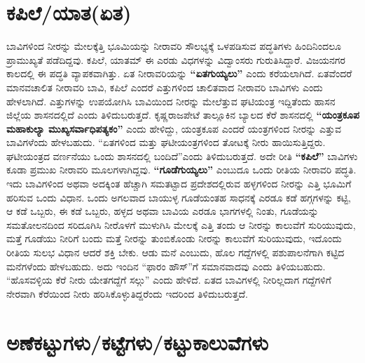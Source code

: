 \section*{ಕಪಿಲೆ/ಯಾತ(ಏತ)}

ಬಾವಿಗಳಿಂದ ನೀರನ್ನು ಮೇಲಕ್ಕೆತ್ತಿ ಭೂಮಿಯನ್ನು ನೀರಾವರಿ ಸೌಲಭ್ಯಕ್ಕೆ ಒಳಪಡಿಸುವ ಪದ್ಧತಿಗಳು ಹಿಂದಿನಿಂದಲೂ ಪ್ರಾಮುಖ್ಯತೆ ಪಡೆದಿದ್ದವು. ಕಪಿಲೆ, ಯಾತಮ್ ಈ ಎರಡು ವಿಧಗಳನ್ನು ವಿದ್ವಾಂಸರು ಗುರುತಿಸಿದ್ದಾರೆ. ವಿಜಯನಗರ ಕಾಲದಲ್ಲಿ ಈ ಪದ್ಧತಿ ವ್ಯಾಪಕವಾಗಿತ್ತು. ಏತ ನೀರಾವರಿಯನ್ನು \textbf{“ಏತಗುಯ್ಯಲು”} ಎಂದು ಕರೆಯಲಾಗಿದೆ. ಏತವೆಂದರೆ ಮಾನವಚಾಲಿತ ನೀರಾವರಿ ಬಾವಿ, ಕಪಿಲೆ ಎಂದರೆ ಎತ್ತುಗಳಿಂದ ಚಾಲಿತವಾದ ನೀರಾವರಿ ಬಾವಿಗಳು ಎಂದು ಹೇಳಲಾಗಿದೆ. ಎತ್ತುಗಳನ್ನು ಉಪಯೋಗಿಸಿ ಬಾವಿಯಿಂದ ನೀರನ್ನು ಮೇಲೆತ್ತುವ ಘಟಿಯಂತ್ರ ಇದ್ದಿತೆಂದು ಹಾಸನ ಜಿಲ್ಲೆಯ ಶಾಸನದಲ್ಲಿದೆ ಎಂದು ತಿಳಿದುಬರುತ್ತದೆ. ಕೃಷ್ಣರಾಜಪೇಟೆ ತಾಲ್ಲೂಕಿನ ಬ್ಯಾಲದ ಕೆರೆ ಶಾಸನದಲ್ಲಿ \textbf{“ಯಂತ್ರಕೂಪ ಮಹಾಕುಲ್ಯಾ ಮುಖ್ಯಸರ್ವಾಧಿಪತ್ಯಕಂ”} ಎಂದು ಹೇಳಿದ್ದು, ಯಂತ್ರಕೂಪ ಎಂದರೆ ಯಂತ್ರಗಳಿಂದ ನೀರನ್ನು ಎತ್ತುವ ಬಾವಿಗಳೆಂದು ಹೇಳಬಹುದು. “ಏತಗಳಿಂದ ಮತ್ತು ಘಟೀಯಂತ್ರಗಳಿಂದ ತೋಟಕ್ಕೆ ನೀರು ಹಾಯಿಸುತ್ತಿದ್ದರು. ಘಟೀಯಂತ್ರದ ವರ್ಣನೆಯು ಒಂದು ಶಾಸನದಲ್ಲಿ ಬಂದಿದೆ”ಎಂದು ತಿಳಿದುಬರುತ್ತದೆ. ಅದೇ ರೀತಿ \textbf{“ಕಪಿಲೆ” }ಬಾವಿಗಳು ಕೂಡಾ ಪ್ರಮುಖ ನೀರಾವರಿ ಮೂಲಗಳಾಗಿದ್ದವು. \textbf{“ಗೂಡೆಗುಯ್ಯಲು”} ಎಂಬುದೂ ಒಂದು ರೀತಿಯ ನೀರಾವರಿ ಪದ್ಧತಿ. ಇದು ಬಾವಿಗಳಿಂದ ಅಥವಾ ಅದಕ್ಕಿಂತ ಹೆಚ್ಚಾಗಿ ಸಮತಟ್ಟಾದ ಪ್ರದೇಶದಲ್ಲಿರುವ ಹಳ್ಳಗಳಿಂದ ನೀರನ್ನು ಎತ್ತಿ ಭೂಮಿಗೆ ಹರಿಸುವ ಒಂದು ವಿಧಾನ. ಒಂದು ಅಗಲವಾದ ಬಾಯುಳ್ಳ ಗೂಡೆಯಂತಹ ಸಾಧನಕ್ಕೆ ಎರಡೂ ಕಡೆ ಹಗ್ಗಗಳನ್ನು ಕಟ್ಟಿ, ಆ ಕಡೆ ಒಬ್ಬರು, ಈ ಕಡೆ ಒಬ್ಬರು, ಹಳ್ಳದ ಅಥವಾ ಬಾವಿಯ ಎರಡೂ ಭಾಗಗಳಲ್ಲಿ ನಿಂತು, ಗೂಡೆಯನ್ನು ಸಮತೋಲನದಿಂದ ಸರಿದೂಗಿಸಿ ನೀರೊಳಗೆ ಮುಳುಗಿಸಿ ಮೇಲಕ್ಕೆ ಎತ್ತಿ ತಂದು ಆ ನೀರನ್ನು ಕಾಲುವೆಗೆ ಸುರಿಯುವುದು, ಮತ್ತೆ ಗೂಡೆಯು ನೀರಿಗೆ ಬಂದು ಮತ್ತೆ ನೀರನ್ನು ತುಂಬಿಕೊಂಡು ನೀರನ್ನು ಕಾಲುವೆಗೆ ಸುರಿಯುವುದು, ಇದೊಂದು ರೀತಿಯ ಸುಲಭ ವಿಧಾನ ಆದರೆ ಶಕ್ತಿ ಬೇಕು. ಆಡು ಮನೆ ಎಂಬುದು, ಹೊಲ ಗದ್ದೆಗಳಲ್ಲಿ ಪಶುಪಾಲನೆಗಾಗಿ ಕಟ್ಟಿದ ಮನೆಗಳೆಂದು ಹೇಳಬಹುದು. ಅದು ಇಂದಿನ “ಫಾರಂ ಹೌಸ್​”ಗೆ ಸಮಾನವಾದವು ಎಂದು ತಿಳಿಯಬಹುದು. “ಹೊಸವಳ್ಳಿಯ ಕೆರೆ ನೀರು ಯೇತಗದ್ದೆಗೆ ಸಲ್ಗು” ಎಂದು ಹೇಳಿದೆ. ಏತದ ಬಾವಿಗಳಲ್ಲಿ ನೀರಿಲ್ಲದಾಗ ಗದ್ದೆಗಳಿಗೆ ನೇರವಾಗಿ ಕೆರೆಯಿಂದ ನೀರು ಹರಿಸಿಕೊಳ್ಳುತಿದ್ದರೆಂದು ಇದರಿಂದ ತಿಳಿದುಬರುತ್ತದೆ.

\section*{ಅಣೆಕಟ್ಟುಗಳು/ಕಟ್ಟೆಗಳು/ಕಟ್ಟುಕಾಲುವೆಗಳು}

